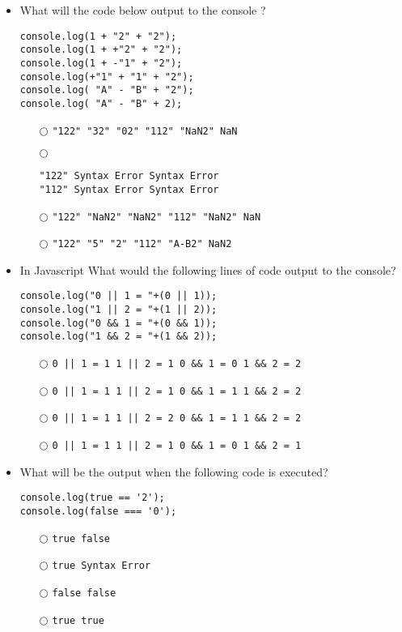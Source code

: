 \documentclass[10pt,twocolumn]{article}
\begin{document}
\begin{itemize}
    \item What will the code below output to the console ?
          \begin{verbatim}
console.log(1 + "2" + "2");
console.log(1 + +"2" + "2");
console.log(1 + -"1" + "2");
console.log(+"1" + "1" + "2");
console.log( "A" - "B" + "2");
console.log( "A" - "B" + 2);
\end{verbatim}
          \begin{itemize}
              \item[$\bigcirc$] \verb="122" "32" "02" "112" "NaN2" NaN=
              \item[$\bigcirc$]
                    \begin{verbatim}
"122" Syntax Error Syntax Error
"112" Syntax Error Syntax Error
\end{verbatim}
              \item[$\bigcirc$] \verb="122" "NaN2" "NaN2" "112" "NaN2" NaN=
              \item[$\bigcirc$] \verb="122" "5" "2" "112" "A-B2" NaN2=
          \end{itemize}
\end{itemize}
\begin{itemize}
    \item In Javascript What would the following lines of code output to the console?
          \begin{verbatim}
console.log("0 || 1 = "+(0 || 1));
console.log("1 || 2 = "+(1 || 2));
console.log("0 && 1 = "+(0 && 1));
console.log("1 && 2 = "+(1 && 2));
\end{verbatim}
          \begin{itemize}
              \item[$\bigcirc$] \verb_0 || 1 = 1 1 || 2 = 1 0 && 1 = 0 1 && 2 = 2_
              \item[$\bigcirc$] \verb_0 || 1 = 1 1 || 2 = 1 0 && 1 = 1 1 && 2 = 2_
              \item[$\bigcirc$] \verb_0 || 1 = 1 1 || 2 = 2 0 && 1 = 1 1 && 2 = 2_
              \item[$\bigcirc$] \verb_0 || 1 = 1 1 || 2 = 1 0 && 1 = 0 1 && 2 = 1_
          \end{itemize}
\end{itemize}
\begin{itemize}
    \item What will be the output when the following code is executed?
          \begin{verbatim}
console.log(true == '2');
console.log(false === '0');
\end{verbatim}
          \begin{itemize}
              \item[$\bigcirc$] \verb=true false=
              \item[$\bigcirc$] \verb=true Syntax Error=
              \item[$\bigcirc$] \verb=false false=
              \item[$\bigcirc$] \verb=true true=
          \end{itemize}
\end{itemize}
\end{document}
